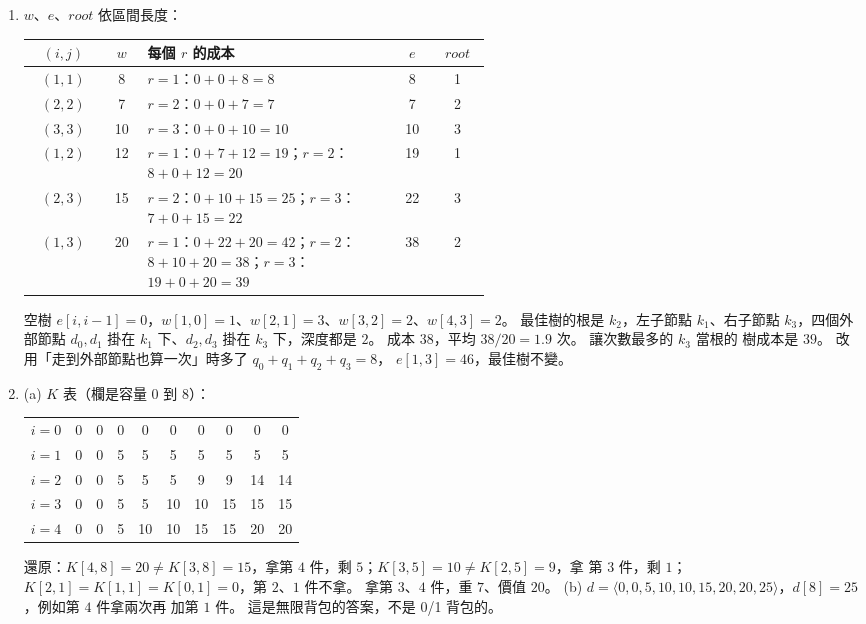 \begin{enumerate}
\item $w$、$e$、$\mathit{root}$ 依區間長度：
{\footnotesize
\begin{center}
\begin{tabular}{c c p{0.55\linewidth} c c}
\toprule
$(i, j)$ & $w$ & 每個 $r$ 的成本 & $e$ & $\mathit{root}$ \\
\midrule
$(1,1)$ & 8 & $r=1$：$0+0+8=8$ & 8 & 1 \\
$(2,2)$ & 7 & $r=2$：$0+0+7=7$ & 7 & 2 \\
$(3,3)$ & 10 & $r=3$：$0+0+10=10$ & 10 & 3 \\
$(1,2)$ & 12 & $r=1$：$0+7+12=19$；$r=2$：$8+0+12=20$ & 19 & 1 \\
$(2,3)$ & 15 & $r=2$：$0+10+15=25$；$r=3$：$7+0+15=22$ & 22 & 3 \\
$(1,3)$ & 20 & $r=1$：$0+22+20=42$；$r=2$：$8+10+20=38$；$r=3$：$19+0+20=39$ & 38 & 2 \\
\bottomrule
\end{tabular}
\end{center}
}
空樹 $e[i, i-1] = 0$，$w[1,0] = 1$、$w[2,1] = 3$、$w[3,2] = 2$、$w[4,3] = 2$。 最佳樹的根是
$k_2$，左子節點 $k_1$、右子節點 $k_3$，四個外部節點 $d_0, d_1$ 掛在 $k_1$ 下、$d_2, d_3$ 掛在
$k_3$ 下，深度都是 $2$。 成本 $38$，平均 $38 / 20 = 1.9$ 次。 讓次數最多的 $k_3$ 當根的
樹成本是 $39$。 改用「走到外部節點也算一次」時多了 $q_0 + q_1 + q_2 + q_3 = 8$，
$e[1, 3] = 46$，最佳樹不變。

\item (a) $K$ 表（欄是容量 $0$ 到 $8$）：
{\footnotesize
\begin{center}
\begin{tabular}{l*{9}{c}}
$i=0$ & 0 & 0 & 0 & 0 & 0 & 0 & 0 & 0 & 0 \\
$i=1$ & 0 & 0 & 5 & 5 & 5 & 5 & 5 & 5 & 5 \\
$i=2$ & 0 & 0 & 5 & 5 & 5 & 9 & 9 & 14 & 14 \\
$i=3$ & 0 & 0 & 5 & 5 & 10 & 10 & 15 & 15 & 15 \\
$i=4$ & 0 & 0 & 5 & 10 & 10 & 15 & 15 & 20 & 20 \\
\end{tabular}
\end{center}
}
還原：$K[4, 8] = 20 \ne K[3, 8] = 15$，拿第 $4$ 件，剩 $5$；$K[3, 5] = 10 \ne K[2, 5] = 9$，拿
第 $3$ 件，剩 $1$；$K[2, 1] = K[1, 1] = K[0, 1] = 0$，第 $2$、$1$ 件不拿。 拿第 $3$、$4$ 件，重
$7$、價值 $20$。
(b) $d = \langle 0, 0, 5, 10, 10, 15, 20, 20, 25 \rangle$，$d[8] = 25$，例如第 $4$ 件拿兩次再
加第 $1$ 件。 這是無限背包的答案，不是 0/1 背包的。


\end{enumerate}
